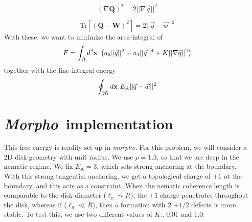 \documentclass{article}
\newcommand{\morpho}{\textit{morpho}}
\newcommand{\Morpho}{\textit{Morpho}}
\begin{document}
\[
(\nabla \mathbf{Q})^2 = 2 ||\nabla \vec{q}||^2
\]

\[
\text{Tr}[(\mathbf{Q}-\mathbf{W})^2] = 2 ||\vec{q}-\vec{w}||^2
\]
With these, we want to minimize the area-integral of 
\[
F = \int_\Omega d^2{\bf x} \ \left( a_2 ||\vec{q}||^2 + a_4 ||\vec{q}||^4 + K||\nabla\vec{q}||^2 \right)
\]
together with the line-integral energy
\[
\oint_{\partial\Omega} d{\bf x} \ E_A ||\vec{q}-\vec{w}||^2
\]

\section{\Morpho \ implementation}
This free energy is readily set up in \morpho. For this problem, we will consider a 2D disk geometry with unit radius. We use $\rho=1.3$, so that we are deep in the nematic regime. We fix $E_{\text{A}}=3$, which sets strong anchoring at the boundary. With this strong tangential anchoring, we get a topological charge of $+1$ at the boundary, and this acts as a constraint. When the nematic coherence length is comparable to the disk diameter ($\ell_n \sim R$), the $+1$ charge penetrates throughout the disk, whereas if ($\ell_n \ll R$), then a formation with 2 $+1/2$ defects is more stable. To test this, we use two different values of $K$:, 0.01 and 1.0.
\end{document}
